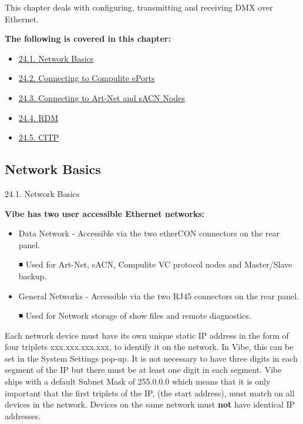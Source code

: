 \documentclass[
]{article}
\providecommand{\tightlist}{%
  \setlength{\itemsep}{0pt}\setlength{\parskip}{0pt}}
\begin{document}
This chapter deals with configuring, transmitting and receiving DMX over Ethernet.

\textbf{The following is covered in this chapter:}

\begin{itemize}
\tightlist
\item
  \href{https://vibemanual.compulite.com/connecting-to-external-devices.html\#network-basics}{24.1. Network Basics}
\item
  \href{https://vibemanual.compulite.com/connecting-to-external-devices.html\#connecting-to-compulite-eports}{24.2. Connecting to Compulite ePorts}
\item
  \href{https://vibemanual.compulite.com/connecting-to-external-devices.html\#connecting-to-art-net-and-sacn-nodes}{24.3. Connecting to Art-Net and sACN Nodes}
\item
  \href{https://vibemanual.compulite.com/connecting-to-external-devices.html\#rdm}{24.4. RDM}
\item
  \href{https://vibemanual.compulite.com/connecting-to-external-devices.html\#citp}{24.5. CITP}
\end{itemize}

\hypertarget{network-basics}{%
\subsection{Network Basics}\label{network-basics}}

24.1. Network Basics

\textbf{Vibe has two user accessible Ethernet networks:}

\begin{itemize}
\item
  Data Network - Accessible via the two etherCON connectors on the rear panel.

  ◾ Used for Art-Net, sACN, Compulite VC protocol nodes and Master/Slave backup.
\item
  General Networks - Accessible via the two RJ45 connectors on the rear panel.

  ◾ Used for Network storage of show files and remote diagnostics.
\end{itemize}

Each network device must have its own unique static IP address in the form of four triplets xxx.xxx.xxx.xxx, to identify it on the network. In Vibe, this can be set in the System Settings pop-up. It is not necessary to have three digits in each segment of the IP but there must be at least one digit in each segment. Vibe ships with a default Subnet Mask of 255.0.0.0 which means that it is only important that the first triplets of the IP, (the start address), must match on all devices in the network. Devices on the same network must \textbf{not} have identical IP addresses.
\end{document}
